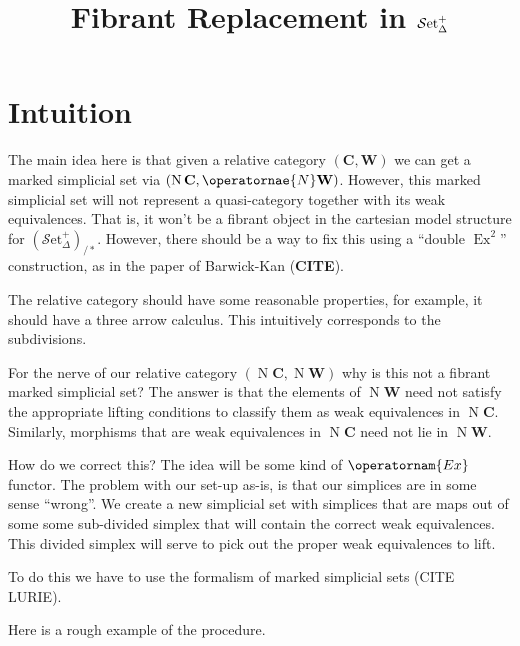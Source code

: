 \documentclass[english]{amsart}
\title{Fibrant Replacement in $\sset^+$}
\author{}
\date{}
\newcommand{\mc}{\mathcal}
\newcommand{\mbf}{\mathbf}
\newcommand{\sset}{\mc{S}\text{et}_\Delta}
\theoremstyle{definition}
\begin{document}
\maketitle
\tableofcontents


\section{Intuition}


The main idea here is that given a relative category $(\mbf{C},\mbf{W})$ we can get a marked simplicial set via $(\operatorname{N}\mbf{C},\operatornae{N}\mbf{W})$. However, this marked simplicial set will not represent a quasi-category together with its weak equivalences. That is, it won't be a fibrant object in the cartesian model structure for $(\sset^+)_{/\ast}$.  However, there should be a way to fix this using a ``double $\operatorname{Ex}^2$'' construction, as in the paper of Barwick-Kan (\textbf{CITE}). 

The relative category should have some reasonable properties, for example, it should have a three arrow calculus. This intuitively corresponds to the subdivisions. 

For the nerve of our relative category $(\operatorname{N}\mbf{C},\operatorname{N}\mbf{W})$ why is this not a fibrant marked simplicial set? The answer is that the elements of $\operatorname{N}\mbf{W}$ need not satisfy the appropriate lifting conditions to classify them as weak equivalences in $\operatorname{N}\mbf{C}$. Similarly, morphisms that are weak equivalences in $\operatorname{N}\mbf{C}$ need not lie in $\operatorname{N}\mbf{W}$. 

How do we correct this? The idea will be some kind of $\operatornam{Ex}$ functor. The problem with our set-up as-is, is that our simplices are in some sense ``wrong''. We create a new simplicial set with simplices that are maps out of some some sub-divided simplex that will contain the correct weak equivalences. This divided simplex will serve to pick out the proper weak equivalences to lift. 

To do this we have to use the formalism of marked simplicial sets (CITE LURIE).

Here is a rough example of the procedure. 
\end{document}
